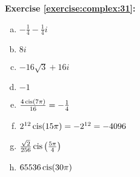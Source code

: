 \noindent\textbf{Exercise \ref{exercise:complex:31}:} %
\begin{multicols}{2}
\begin{enumerate}[(a)]
\item
$-\frac{1}{4} - \frac{1}{4}i$

\item
$8i$

\item
$-16\sqrt{3}+16i$

\item
$-1$

\item
$\frac{4\operatorname{cis}(7\pi)}{16}=-\frac{1}{4}$

\item
$2^{12}\operatorname{cis}(15\pi)=-2^{12}= -4096$
 
\item
$\frac{\sqrt{2}}{256}\operatorname{cis}\left(\frac{5\pi}{4}\right)$

\item
$65536\operatorname{cis}(30\pi)$
\end{enumerate}
\end{multicols}

